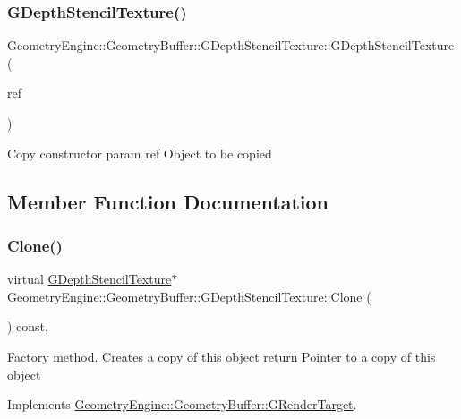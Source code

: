 \subsubsection{\texorpdfstring{GDepthStencilTexture()}{GDepthStencilTexture()}\hspace{0.1cm}{\footnotesize\ttfamily [3/3]}}
{\footnotesize\ttfamily Geometry\+Engine\+::\+Geometry\+Buffer\+::\+G\+Depth\+Stencil\+Texture\+::\+G\+Depth\+Stencil\+Texture (\begin{DoxyParamCaption}\item[{const \mbox{\hyperlink{class_geometry_engine_1_1_geometry_buffer_1_1_g_depth_stencil_texture}{G\+Depth\+Stencil\+Texture}} \&}]{ref }\end{DoxyParamCaption})}

Copy constructor param ref Object to be copied 

\subsection{Member Function Documentation}
\mbox{\label{class_geometry_engine_1_1_geometry_buffer_1_1_g_depth_stencil_texture_ae831cf8a8610c82ae4b50622348b4e57}} 
\subsubsection{\texorpdfstring{Clone()}{Clone()}}
{\footnotesize\ttfamily virtual \mbox{\hyperlink{class_geometry_engine_1_1_geometry_buffer_1_1_g_depth_stencil_texture}{G\+Depth\+Stencil\+Texture}}$\ast$ Geometry\+Engine\+::\+Geometry\+Buffer\+::\+G\+Depth\+Stencil\+Texture\+::\+Clone (\begin{DoxyParamCaption}{ }\end{DoxyParamCaption}) const\hspace{0.3cm}{\ttfamily [inline]}, {\ttfamily [virtual]}}

Factory method. Creates a copy of this object return Pointer to a copy of this object 

Implements \mbox{\hyperlink{class_geometry_engine_1_1_geometry_buffer_1_1_g_render_target_a3b14d8929cf9d2acb6bc263c709ff019}{Geometry\+Engine\+::\+Geometry\+Buffer\+::\+G\+Render\+Target}}.

